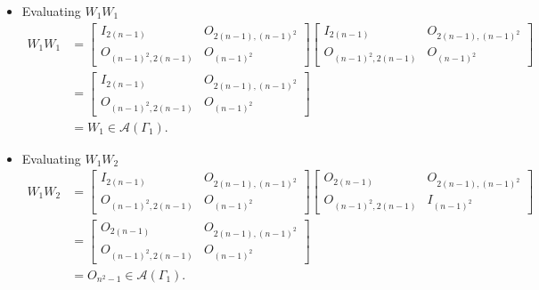 \begin{itemize}
    \item Evaluating $W_1W_1$
    \begin{align*}
        W_1W_1 &=
        \begin{bmatrix}
            I_{2(n-1)} & O_{2(n-1), (n-1)^2} \\
            O_{(n-1)^2, 2(n-1)} & O_{(n-1)^2}
        \end{bmatrix}\begin{bmatrix}
            I_{2(n-1)} & O_{2(n-1), (n-1)^2} \\
            O_{(n-1)^2, 2(n-1)} & O_{(n-1)^2}
        \end{bmatrix} \\
        &= \begin{bmatrix}
            I_{2(n-1)} & O_{2(n-1), (n-1)^2} \\
            O_{(n-1)^2, 2(n-1)} & O_{(n-1)^2}
        \end{bmatrix} \\
        &= W_1 \in \mathcal{A}(\Gamma_1).
    \end{align*}
    
    \item Evaluating $W_1W_2$
    \begin{align*}
        W_1W_2 
        &= \begin{bmatrix}
            I_{2(n-1)} & O_{2(n-1), (n-1)^2} \\
            O_{(n-1)^2, 2(n-1)} & O_{(n-1)^2}
        \end{bmatrix}\begin{bmatrix}
            O_{2(n-1)} & O_{2(n-1), (n-1)^2} \\
            O_{(n-1)^2, 2(n-1)} & I_{(n-1)^2}
        \end{bmatrix} \\
        &= \begin{bmatrix}
            O_{2(n-1)} & O_{2(n-1), (n-1)^2} \\
            O_{(n-1)^2, 2(n-1)} & O_{(n-1)^2}
        \end{bmatrix}\\
        &= O_{n^2-1} \in \mathcal{A}(\Gamma_1).
    \end{align*}
    

\end{itemize}
